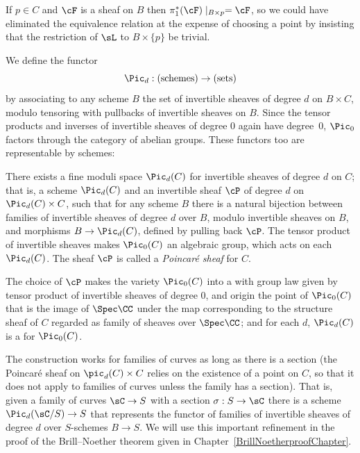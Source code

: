 If $p \in C$ and $\cF$ is a sheaf on $B$ then $\pi_1^*(\cF)\mid_{B\times p} = \cF$, so we could have eliminated the
equivalence relation at the expense of choosing a point by insisting that the restriction of $\sL$ to $B \times \{p\}$ be trivial.
 
We define the functor
%
 $$
 \Pic_d : (\textrm{schemes}) \to (\textrm{sets})
 $$
by associating to any scheme $B$ the set of invertible sheaves of
degree $d$ on $B \times C$, modulo tensoring with pullbacks of
invertible sheaves on $B$. Since the tensor products and inverses of
invertible sheaves of degree 0 again 
have
degree~0, 
$\Pic_0$ factors through the category of abelian groups. These
functors too are representable by schemes:
  
\begin{fact}
There exists a fine moduli space $\Pic_d(C)$ for invertible sheaves of
degree $d$ on $C$; that is, a scheme $\Pic_d(C)$ and an invertible
sheaf $\cP$ of degree $d$ on $\Pic_d(C) \times C$, such that for any
scheme $B$ there is a natural bijection between families of invertible
sheaves of degree $d$ over $B$, modulo invertible sheaves on $B$, and
morphisms $B \to \Pic_d(C)$, defined by pulling back $\cP$. The tensor
product of invertible sheaves makes $\Pic_0(C)$ an algebraic group,
which acts on each $\Pic_d(C)$. The sheaf $\cP$ is called a
%
\emph{Poincar\'e sheaf} for $C$. 

The choice of $\cP$ makes the variety $\Pic_0(C)$ into a 
%
%
with group law given by tensor product of
invertible sheaves of degree 0, and origin the point of $\Pic_0(C)$
that is the 
 image of $\Spec \CC$ under the map corresponding to the structure sheaf of $C$ regarded
 as family of sheaves over $\Spec \CC$; and for each $d$, $\Pic_d(C)$
 is a 
%
for $\Pic_0(C)$. 

The construction works for families of curves as long as there is a section (the Poincar\'e sheaf on $\pic_d(C) \times C$ relies on the existence of a point on $C$, so that it does not apply to families of curves unless the family has a section). That is, given a family of curves $\sC \to S$ with a section $\sigma: S\to \sC$
 there is a scheme $\Pic_{d}(\sC/S) \to S$ that represents the functor of families of invertible sheaves of
 degree $d$ over $S$-schemes $B\to S$. We will use this important refinement in the proof of the Brill--Noether theorem given in Chapter~\ref{BrillNoetherproofChapter}.
  \end{fact}
  
